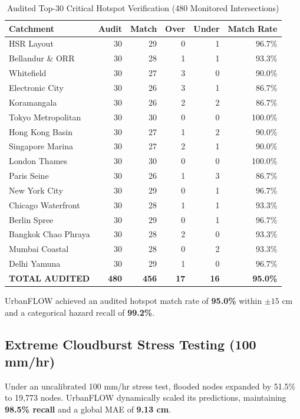 \documentclass[conference]{IEEEtran}
\begin{document}
\begin{table}[h]
\caption{Audited Top-30 Critical Hotspot Verification (480 Monitored Intersections)}
\label{tab:hotspot_audit}
\centering
\small
\begin{tabular}{lrrrrr}
\toprule
\textbf{Catchment} & \textbf{Audit} & \textbf{Match} & \textbf{Over} & \textbf{Under} & \textbf{Match Rate} \\
\midrule
HSR Layout & 30 & 29 & 0 & 1 & 96.7\% \\
Bellandur \& ORR & 30 & 28 & 1 & 1 & 93.3\% \\
Whitefield & 30 & 27 & 3 & 0 & 90.0\% \\
Electronic City & 30 & 26 & 3 & 1 & 86.7\% \\
Koramangala & 30 & 26 & 2 & 2 & 86.7\% \\
Tokyo Metropolitan & 30 & 30 & 0 & 0 & 100.0\% \\
Hong Kong Basin & 30 & 27 & 1 & 2 & 90.0\% \\
Singapore Marina & 30 & 27 & 2 & 1 & 90.0\% \\
London Thames & 30 & 30 & 0 & 0 & 100.0\% \\
Paris Seine & 30 & 26 & 1 & 3 & 86.7\% \\
New York City & 30 & 29 & 0 & 1 & 96.7\% \\
Chicago Waterfront & 30 & 28 & 1 & 1 & 93.3\% \\
Berlin Spree & 30 & 29 & 0 & 1 & 96.7\% \\
Bangkok Chao Phraya & 30 & 28 & 2 & 0 & 93.3\% \\
Mumbai Coastal & 30 & 28 & 0 & 2 & 93.3\% \\
Delhi Yamuna & 30 & 29 & 1 & 0 & 96.7\% \\
\midrule
\textbf{TOTAL AUDITED} & \textbf{480} & \textbf{456} & \textbf{17} & \textbf{16} & \textbf{95.0\%} \\
\bottomrule
\end{tabular}
\end{table}

UrbanFLOW achieved an audited hotspot match rate of \textbf{95.0\%} within $\pm 15\text{ cm}$ and a categorical hazard recall of \textbf{99.2\%}.

\subsection{Extreme Cloudburst Stress Testing (100 mm/hr)}
Under an uncalibrated 100 mm/hr stress test, flooded nodes expanded by 51.5\% to 19,773 nodes. UrbanFLOW dynamically scaled its predictions, maintaining \textbf{98.5\% recall} and a global MAE of \textbf{9.13 cm}.
\end{document}
